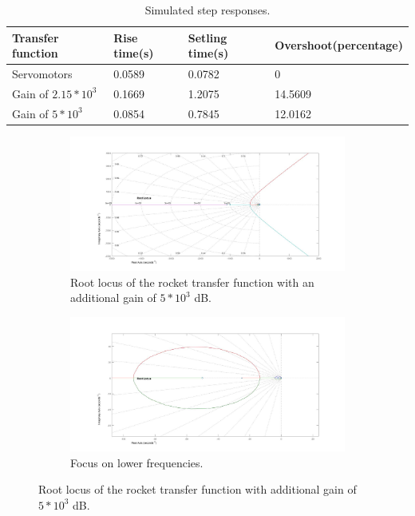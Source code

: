 \begin{table}[htbp]
	\centering
	\caption{Simulated step responses.}
	\label{TableStepr}
	\begin{tabular}{llll}
		Transfer function & Rise time{(}s{)} & Setling time{(}s{)} & Overshoot{(}percentage{)} \\ \hline  \rowcolor{lightGrey}
		Servomotors     & 0.0589 & 0.0782 & 0\\  
		Gain of $2.15*10^3$     & 0.1669 & 1.2075 & 14.5609  \\  
		\rowcolor{lightGrey}           
		Gain of $5*10^3$     & 0.0854 & 0.7845 & 12.0162      \\     
	\end{tabular}
\end{table}

\begin{figure}[htbp]
	\centering
	\begin{subfigure}{0.45\textwidth}
		\includegraphics[width=\textwidth]{figures/Rocket/design/tf_with_controller_5}
		\caption{Root locus of the rocket transfer function with an additional gain of $5 * 10^3$ \si{\dB}.}
		\label{fig:FinalRocketTf}
	\end{subfigure}
	\begin{subfigure}{0.45\textwidth}
		\includegraphics[width=\textwidth]{figures/Rocket/design/tf_with_controller_5_zoom}
		\caption{Focus on lower frequencies.}
		\label{fig:FinalRocketTfZoom}
	\end{subfigure}
	\caption{Root locus of the rocket transfer function with additional gain of $5*10^3$ \si{\dB}.}	
\end{figure}


